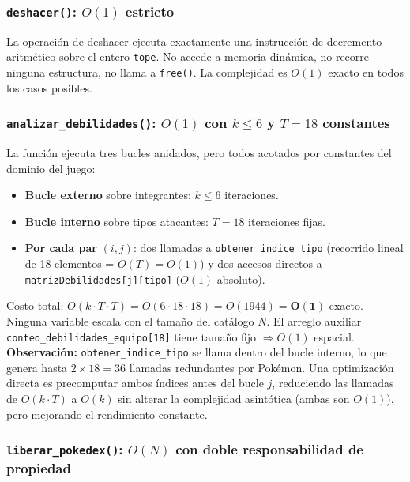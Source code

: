 \documentclass[12pt, letterpaper]{article}
\begin{document}
\subsubsection{\texttt{deshacer()}: $O(1)$ estricto}

La operación de deshacer ejecuta exactamente una instrucción de decremento aritmético sobre el entero \texttt{tope}. No accede a memoria dinámica, no recorre ninguna estructura, no llama a \texttt{free()}. La complejidad es $O(1)$ exacto en todos los casos posibles.

\subsubsection{\texttt{analizar\_debilidades()}: $O(1)$ con $k \leq 6$ y $T = 18$ constantes}

La función ejecuta tres bucles anidados, pero todos acotados por constantes del dominio del juego:
\begin{itemize}
    \item \textbf{Bucle externo} sobre integrantes: $k \leq 6$ iteraciones.
    \item \textbf{Bucle interno} sobre tipos atacantes: $T = 18$ iteraciones fijas.
    \item \textbf{Por cada par} $(i, j)$: dos llamadas a \texttt{obtener\_indice\_tipo} (recorrido lineal de 18 elementos = $O(T) = O(1)$) y dos accesos directos a \texttt{matrizDebilidades[j][tipo]} ($O(1)$ absoluto).
\end{itemize}
Costo total: $O(k \cdot T \cdot T) = O(6 \cdot 18 \cdot 18) = O(1944) = \mathbf{O(1)}$ exacto. Ninguna variable escala con el tamaño del catálogo $N$. El arreglo auxiliar \texttt{conteo\_debilidades\_equipo[18]} tiene tamaño fijo $\Rightarrow O(1)$ espacial.
\textbf{Observación:} \texttt{obtener\_indice\_tipo} se llama dentro del bucle interno, lo que genera hasta $2 \times 18 = 36$ llamadas redundantes por Pokémon. Una optimización directa es precomputar ambos índices antes del bucle $j$, reduciendo las llamadas de $O(k \cdot T)$ a $O(k)$ sin alterar la complejidad asintótica (ambas son $O(1)$), pero mejorando el rendimiento constante.

\subsubsection{\texttt{liberar\_pokedex()}: $O(N)$ con doble responsabilidad de propiedad}
\end{document}
